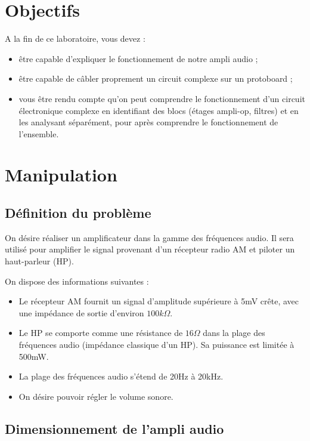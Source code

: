 \documentclass{../template/labo}
\begin{document}
\section{Objectifs}
A la fin de ce laboratoire, vous devez  :
\vspace{3mm}
\begin{itemize}
\item être capable d'expliquer le fonctionnement de notre ampli audio ;
\item être capable de câbler proprement un circuit complexe sur un protoboard ;
\item vous être rendu compte qu'on peut comprendre le fonctionnement d'un circuit électronique complexe en identifiant des blocs (étages ampli-op, filtres) et en les analysant séparément, pour après comprendre le fonctionnement de l'ensemble.
\end{itemize}



\section{Manipulation}
\subsection{Définition du problème}
On désire réaliser un amplificateur dans la gamme des fréquences audio. Il sera utilisé pour amplifier le signal provenant d'un récepteur radio AM et piloter un haut-parleur (HP).

On dispose des informations suivantes :
\vspace{3mm}
\begin{itemize}
\item Le récepteur AM fournit un signal d'amplitude supérieure à 5mV crête, avec une impédance de sortie d'environ $100k\Omega$.
\item Le HP se comporte comme une résistance de $16\Omega$ dans la plage des fréquences audio (impédance classique d'un HP). Sa puissance est limitée à 500mW.
\item La plage des fréquences audio s'étend de 20Hz à 20kHz.
\item On désire pouvoir régler le volume sonore.
\end{itemize}


\subsection{Dimensionnement de l'ampli audio}
\label{Dimensionnement}
\end{document}
